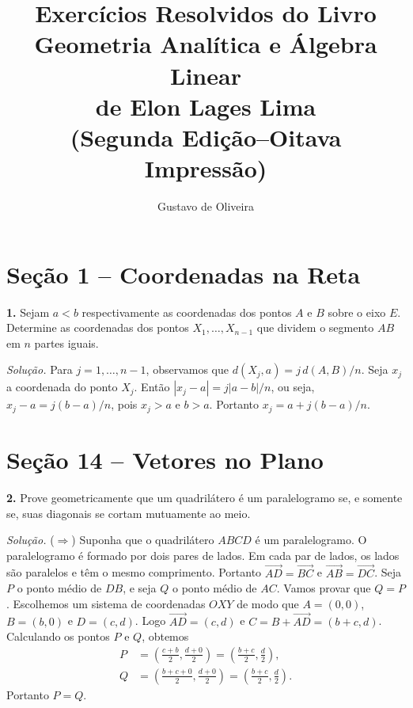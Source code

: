 \documentclass[a4paper,11pt]{article}
\title{Exercícios Resolvidos do Livro\\Geometria Analítica e Álgebra Linear\\de Elon Lages Lima\\(Segunda Edição--Oitava Impressão)}
\author{Gustavo de Oliveira}
\begin{document}
\maketitle

\section*{Seção 1 -- Coordenadas na Reta}

\textbf{1.}
Sejam $a < b$ respectivamente as coordenadas dos pontos $A$ e $B$ sobre o eixo $E$.
Determine as coordenadas dos pontos $X_1, \dots, X_{n-1}$ que dividem o segmento $AB$ em $n$ partes iguais.

\vspace{\baselineskip}

\emph{Solução.}
Para $j = 1, \dots, n-1$, observamos que $d(X_j,a) = j \, d(A,B)/n$.
Seja $x_j$ a coordenada do ponto $X_j$.
Então $|x_j - a| = j|a-b|/n$, ou seja, $x_j - a = j(b-a)/n$, pois $x_j > a$ e $b > a$.
Portanto $x_j = a + j(b-a)/n$.

\section*{Seção 14 -- Vetores no Plano}

\textbf{2.}
Prove geometricamente que um quadrilátero é um paralelogramo se, e somente se, suas diagonais se cortam mutuamente ao meio.

\vspace{\baselineskip}

\emph{Solução.}
($\Rightarrow$)
Suponha que o quadrilátero $ABCD$ é um paralelogramo.
O paralelogramo é formado por dois pares de lados.
Em cada par de lados, os lados são paralelos e têm o mesmo comprimento.
Portanto $\overrightarrow{AD} = \overrightarrow{BC}$ e $\overrightarrow{AB} = \overrightarrow{DC}$.
Seja $P$ o ponto médio de $DB$, e seja $Q$ o ponto médio de $AC$.
Vamos provar que $Q = P$.
Escolhemos um sistema de coordenadas $OXY$ de modo que $A = (0,0)$, $B = (b,0)$ e $D = (c, d)$.
Logo $\overrightarrow{AD} = (c,d)$ e $C = B + \overrightarrow{AD} = (b + c, d)$.
Calculando os pontos $P$ e $Q$, obtemos
\begin{align*}
  P & = \left( \frac{c+b}{2}, \frac{d+0}{2} \right) = \left( \frac{b+c}{2}, \frac{d}{2} \right), \\
  Q & = \left( \frac{b + c + 0}{2}, \frac{d+0}{2} \right) = \left( \frac{b+c}{2}, \frac{d}{2} \right).
\end{align*}
Portanto $P = Q$.
\end{document}

